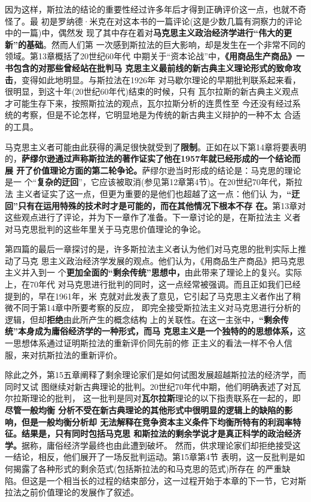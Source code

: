因为这样，斯拉法的结论的重要性经过许多年后才得到正确评价这一点，也就不奇怪了。最
初是罗纳德·米克在对这本书的一篇评论(这是少数几篇有洞察力的评论中的一篇)中，偶然发
现了其中存在着对\textbf{马克思主义政治经济学进行“伟大的更新”的基础}。然而人们第
一次感到斯拉法的巨大影响，却是发生在一个非常不同的领域。第13章概括了20世纪60年代
中期关于“资本论战”中，\textbf{《用商品生产商品》一书包含的对那些曾经站在批判马
  克思主义最前线的新古典主义理论形式的致命攻击}，变得如此地明显。与斯拉法在1926年
对马歇尔理论的早期批判联系起来看，很明显，到这十年(20世纪60年代)结束的时候，只有
瓦尔拉斯的新古典主义观点才可能生存下来，按照斯拉法的观点，瓦尔拉斯分析的连贯性至
今还没有经过系统的考察，但是不论怎样，它明显地是为传统的新古典主义辩护的一种不太
合适的工具。

马克思主义者可能由此获得的满足很快就受到了\textbf{限制}。正如在以下第14章将要表明
的，\textbf{萨缪尔逊通过声称斯拉法的著作证实了他在1957年就已经形成的一个结论而展
  开了价值理论方面的第二轮争论。}萨缪尔逊当时形成的结论是：马克思的理论是一
个“\textbf{复杂的迂回}”，它应该被取消(参见第12章第4节)。在20世纪70年代，斯拉法
主义者证实了这一点，但更为重要的是他们也超越了这一点：他们认
为，\textbf{“迂回”只有在运用特殊的技术时才是可能的，而在其他情况下根本不存
  在。}第13章对这些观点进行了评论，并为下一章作了准备。下一章讨论的是，在斯拉法主
义者对马克思批判的这些年里关于马克思价值理论的争论。

第四篇的最后一章探讨的是，许多斯拉法主义者认为他们对马克思的批判实际上推动了马克
思主义政治经济学发展的观点。他们认为，《用商品生产商品》把马克思主义并入到一
个\textbf{更加全面的“剩余传统”思想中，}由此带来了理论上的复兴。实际上，在70年代
对马克思进行批判的同时，这一点经常被强调。而且正如我们已经提到的，早在1961年，米
克就对此发表了意见，它引起了马克思主义者作出了稍微不同于第14章中所要考察的反应，
即完全接受斯拉法主义对马克思进行分析的逻辑，但却\textbf{拒绝}由此所产生的概念结构
上的关联性。在这一主张中，\textbf{“剩余传统”本身成为庸俗经济学的一种形式，而马
  克思主义是一个独特的的思想体系，}这一思想体系通过证明斯拉法的重新评价同先前的修
正主义的看法一样不令人信服，来对抗斯拉法的重新评价。

除此之外，第15五章阐释了剩余理论家们是如何试图发展超越斯拉法的经济学，而同时又试
图继续对新古典理论的批判。20世纪70年代中期，他们明确表述了对瓦尔拉斯理论的批判，
这一批判是同对\textbf{瓦尔拉斯}理论的以下指责联系在一起的，即\textbf{尽管一般均衡
  分析不受在新古典理论的其他形式中很明显的逻辑上的缺陷的影响，但是一般均衡分析却
  无法解释在竞争资本主义条件下均衡所特有的利润率特征。结果是，只有同时包括马克思
  和斯拉法的剩余学说才是真正科学的政治经济学。}据称，庸俗经济学最终也由此遭到破坏。
然而，供求理论家们却拒绝接受这一结论，相反，他们展开了一场反批判运动。第15章第4节
表明，这一反批判是如何揭露了各种形式的剩余范式(包括斯拉法的和马克思的范式)所存在
的严重缺陷。但这是一个相当长的过程的结束部分，这一过程开始于本章的下一节，它对斯
拉法之前价值理论的发展作了叙述。

